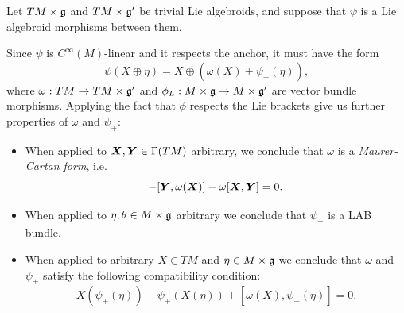 \begin{example}\label{exampleLieAlgebroidMorphismsBetweenTrivialLieAlgebroids}
Let $TM \times \mathfrak{g}$ and $TM \times \mathfrak{g}'$ be trivial Lie algebroids, and suppose that $\psi$ is a Lie algebroid morphisms between them.

Since $\psi$ is $C^\infty(M)$-linear and it respects the anchor, it must have the form
\begin{equation}\label{equationFormOFGeneralMorphismTrivialLieAlgebroidsBetween}
    \psi(X \oplus \eta) = X \oplus (\omega(X) + \psi_+(\eta)),
\end{equation}
where $\omega: TM \to TM \times \mathfrak{g}'$ and $\phi_L: M \times \alg g \to M \times \alg g'$ are vector bundle morphisms.
Applying the fact that $\phi$ respects the Lie brackets give us further properties of $\omega$ and $\psi_+$:
\begin{itemize}
    
    \item When applied to $\bm{X}, \bm{Y} \in \Gamma(TM)$ arbitrary, we conclude that $\omega$ is a \textit{Maurer-Cartan form}, i.e. 
        \begin{equation}
            [\sect X, \omega(\sect Y)] - [\sect Y , \omega(\sect X)] - \omega[\sect X, \sect Y] = 0.
        \end{equation}
    
    \item When applied to $\eta, \theta \in M \times \mathfrak{g}$ arbitrary we conclude that $\psi_+$ is a LAB bundle.
    
    \item When applied to arbitrary $X \in TM$ and $\eta \in M \times \mathfrak{g}$ we conclude that $\omega$ and $\psi_+$ satisfy the following compatibility condition:
    \begin{equation}
        X(\psi_+(\eta)) - \psi_+(X(\eta)) + [\omega(X), \psi_+(\eta)] = 0.
    \end{equation}
    
\end{itemize}

\end{example}


